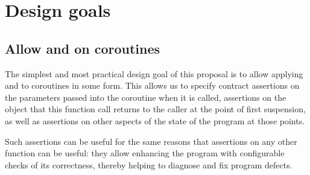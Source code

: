 
\section{Design goals}

\subsection{Allow  and  on coroutines}

The simplest and most practical design goal of this proposal is to allow applying  and  to coroutines in some form. This allows us to specify contract assertions on the parameters passed into the coroutine when it is called, assertions on the object that this function call returns to the caller at the point of first suspension, as well as assertions on other aspects of the state of the program at those points.

Such assertions can be useful for the same reasons that assertions on any other function can be useful: they allow enhancing the program with configurable checks of its correctness, thereby helping to diagnose and fix program defects.

